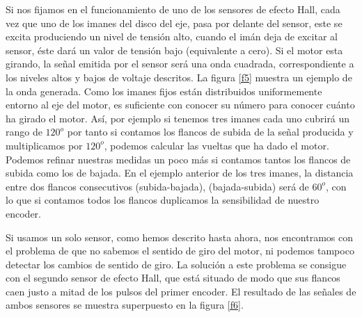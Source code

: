\documentclass[10pt,a4paper]{report}
\begin{document}
Si nos fijamos en el funcionamiento de uno de los sensores de efecto Hall, cada vez que uno de los imanes del disco del eje, pasa por delante del sensor, este se excita produciendo un nivel de tensión alto, cuando el imán deja de excitar al sensor, éste dará un valor de tensión bajo (equivalente a cero). Si el motor esta girando, la señal emitida por el sensor será una onda cuadrada, correspondiente a los niveles altos y bajos de voltaje descritos. La figura \ref{f5} muestra un ejemplo de la onda generada. Como los imanes fijos están distribuidos uniformemente entorno al eje del motor, es suficiente con conocer su número para conocer cuánto ha girado el motor. Así, por ejemplo si tenemos tres imanes cada uno cubrirá un rango de $120^o$ por tanto si contamos los flancos de subida de la señal producida y multiplicamos por $120^o$, podemos calcular las vueltas que ha dado el motor. Podemos refinar nuestras medidas un poco  más si contamos tantos los flancos de subida como los de bajada. En el ejemplo anterior de los tres imanes, la distancia entre dos flancos consecutivos (subida-bajada), (bajada-subida) será de $60^o$, con lo que si contamos todos los flancos duplicamos la sensibilidad de nuestro encoder.

Si usamos un solo sensor, como hemos descrito hasta ahora, nos encontramos con el problema de que no sabemos el sentido de giro del motor, ni podemos tampoco detectar los cambios de sentido de giro.
La solución a este problema se consigue con el segundo sensor de efecto Hall, que está situado de modo que sus flancos caen justo a mitad de los pulsos del primer encoder. El resultado de las señales de  ambos sensores  se muestra superpuesto en la figura \ref{f6}. 
\end{document}

